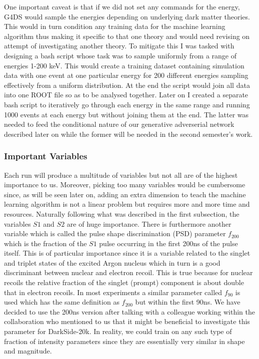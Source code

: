 \documentclass[11pt]{article} %
\begin{document}
One important caveat is that if we did not set any commands for the energy, G4DS would sample the energies depending on underlying dark matter theories. This would in turn condition any training data for the machine learning algorithm thus making it specific to that one theory and would need revising on attempt of investigating another theory. To mitigate this I was tasked with designing a bash script whose task was to sample uniformly from a range of energies 1-200 keV. This would create a training dataset containing simulation data with one event at one particular energy for 200 different energies sampling effectively from a uniform distribution. At the end the script would join all data into one ROOT \cite{root} file so as to be analysed together. Later on I created a separate bash script to iteratively go through each energy in the same range and running 1000 events at each energy but without joining them at the end. The latter was needed to feed the conditional nature of our generative adverserial network described later on while the former will be needed in the second semester's work.

\subsubsection{Important Variables}
Each run will produce a multitude of variables but not all are of the highest importance to us.
Moreover, picking too many variables would be cumbersome since, as will be seen later on, adding an extra dimension to teach the machine learning algorithm is not a linear problem but requires more and more time and resources.
Naturally following what was described in the first subsection, the variables \textbf{$S1$} and \textbf{$S2$} are of huge importance.
There is furthermore another variable which is called the pulse shape discrimination (PSD) parameter \cite{smith1996improved} \textbf{$f_{200}$} which is the fraction of the $S1$ pulse occurring in the first 200ns of the pulse itself.
This is of particular importance since it is a variable related to the singlet and triplet states of the excited Argon nucleus which in turn is a good discriminant between nuclear and electron recoil.
This is true because for nuclear recoils the relative fraction of the singlet (prompt) component is about double that in electron recoils.
In most experiments a similar parameter called \textbf{$f_{90}$} is used \cite{bernabei1998new} which has the same definition as \textbf{$f_{200}$} but within the first 90ns.
We have decided to use the 200ns version after talking with a colleague working within the collaboration who mentioned to us that it might be beneficial to investigate this parameter for DarkSide-20k.
In reality, we could train on any such type of fraction of intensity parameters since they are essentially very similar in shape and magnitude.
\end{document}
